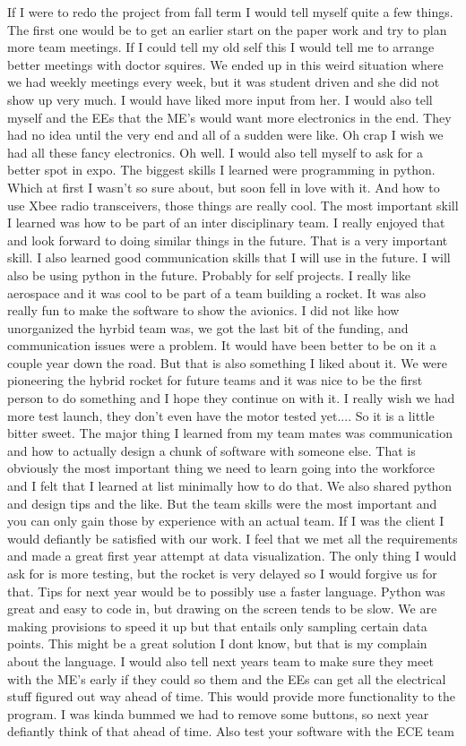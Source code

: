 \documentclass[10pt,draftclsnofoot,onecolumn,retainorgcmds]{IEEEtran}
\begin{document}
 If I were to redo the project from fall term I would tell myself quite a few things. The first one would be to get an earlier start on the paper work and try to plan more team meetings. If I could tell my old self this I would tell me to arrange better meetings with doctor squires. We ended up in this weird situation where we had weekly meetings every week, but it was student driven and she did not show up very much. I would have liked more input from her. I would also tell myself and the EEs that the ME's would want more electronics in the end. They had no idea until the very end and all of a sudden were like. Oh crap I wish we had all these fancy electronics. Oh well. I would also tell myself to ask for a better spot in expo. The biggest skills I learned were programming in python. Which at first I wasn't so sure about, but soon fell in love with it. And how to use Xbee radio transceivers, those things are really cool. The most important skill I learned was how to be part of an inter disciplinary team. I really enjoyed that and look forward to doing similar things in the future. That is a very important skill. I also learned good communication skills that I will use in the future. I will also be using python in the future. Probably for self projects. I really like aerospace and it was cool to be part of a team building a rocket. It was also really fun to make the software to show the avionics. I did not like how unorganized the hyrbid team was, we got the last bit of the funding, and communication issues were a problem. It would have been better to be on it a couple year down the road. But that is also something I liked about it. We were pioneering the hybrid rocket for future teams and it was nice to be the first person to do something and I hope they continue on with it. I really wish we had more test launch, they don't even have the motor tested yet.... So it is a little bitter sweet. The major thing I learned from my team mates was communication and how to actually design a chunk of software with someone else. That is obviously the most important thing we need to learn going into the workforce and I felt that I learned at list minimally how to do that. We also shared python and design tips and the like. But the team skills were the most important and you can only gain those by experience with an actual team. If I was the client I would defiantly be satisfied with our work. I feel that we met all the requirements and made a great first year attempt at data visualization. The only thing I would ask for is more testing, but the rocket is very delayed so I would forgive us for that. Tips for next year would be to possibly use a faster language. Python was great and easy to code in, but drawing on the screen tends to be slow. We are making provisions to speed it up but that entails only sampling certain data points. This might be a great solution I dont know, but that is my complain about the language. I would also tell next years team to make sure they meet with the ME's early if they could so them and the EEs can get all the electrical stuff figured out way ahead of time. This would provide more functionality to the program. I was kinda bummed we had to remove some buttons, so next year defiantly think of that ahead of time. Also test your software with the ECE team 
\end{document}
